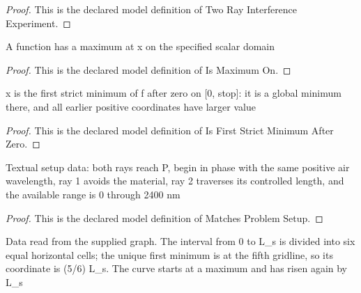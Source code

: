 \begin{proof}
  This is the declared model definition of Two Ray Interference Experiment.
\end{proof}
\begin{definition}[Is Maximum On]
  \label{def:physics:phyx-mini-0088:phyxminiproblems-problemphyxmini0088-ismaximumon}
  A function has a maximum at x on the specified scalar domain
\end{definition}
\begin{proof}
  This is the declared model definition of Is Maximum On.
\end{proof}
\begin{definition}
  \label{def:physics:phyx-mini-0088:phyxminiproblems-problemphyxmini0088-isfirststrictminimumafterzero}
  x is the first strict minimum of f after zero on [0, stop]: it is a global minimum there, and all earlier positive coordinates have larger value
\end{definition}
\begin{proof}
  This is the declared model definition of Is First Strict Minimum After Zero.
\end{proof}
\begin{definition}
  \label{def:physics:phyx-mini-0088:phyxminiproblems-problemphyxmini0088-matchesproblemsetup}
  Textual setup data: both rays reach P, begin in phase with the same positive air wavelength, ray 1 avoids the material, ray 2 traverses its controlled length, and the available range is 0 through 2400 nm
\end{definition}
\begin{proof}
  This is the declared model definition of Matches Problem Setup.
\end{proof}
\begin{definition}
  \label{def:physics:phyx-mini-0088:phyxminiproblems-problemphyxmini0088-matchesintensityfigure}
  Data read from the supplied graph. The interval from 0 to L\_s is divided into six equal horizontal cells; the unique first minimum is at the fifth gridline, so its coordinate is (5/6) L\_s. The curve starts at a maximum and has risen again by L\_s
\end{definition}

